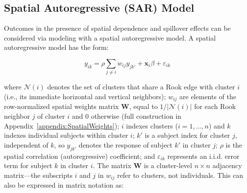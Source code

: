 \documentclass{article}[11pt]
\begin{document}




\subsection{Spatial Autoregressive (SAR) Model}\label{section:SAR}

Outcomes in the presence of spatial dependence and spillover effects can be considered via modeling with a spatial autoregressive model\cite{waller_applied_2004}\cite{fotheringham_sage_2009}\cite{ullah_handbook_1998}. A spatial autoregressive model has the form:

\begin{equation}\label{Equation:SARmodel}
    y_{ik} = \rho\sum_{j \neq i} w_{ij}y_{jk'} + \mathbf{x}_i \beta + \varepsilon_{ik}
\end{equation}

\noindent where $\mathcal{N}(i)$ denotes the set of clusters that share a Rook edge with cluster $i$ (i.e., its immediate horizontal and vertical neighbors); $w_{ij}$ are elements of the row-normalized spatial weights matrix $\mathbf{W}$, equal to $1/|\mathcal{N}(i)|$ for each Rook neighbor $j$ of cluster $i$ and 0 otherwise (full construction in Appendix~\ref{appendix:SpatialWeights}); $i$ indexes clusters ($i = 1, \ldots, n$) and $k$ indexes individual subjects within cluster $i$; $k'$ is a subject index for cluster $j$, independent of $k$, so $y_{jk'}$ denotes the response of subject $k'$ in cluster $j$; $\rho$ is the spatial correlation (autoregressive) coefficient; and $\varepsilon_{ik}$ represents an i.i.d. error term for subject $k$ in cluster $i$. The matrix $\mathbf{W}$ is a cluster-level $n \times n$ adjacency matrix---the subscripts $i$ and $j$ in $w_{ij}$ refer to clusters, not individuals. This can also be expressed in matrix notation as:
\end{document}
